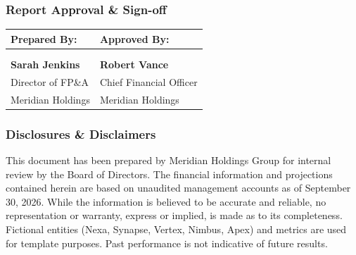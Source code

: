 \noindent
\begin{minipage}[t]{0.48\textwidth}
  \subsubsection*{Report Approval \& Sign-off}
  \vspace{5pt}
  \begin{tabularx}{\linewidth}{X X}
    \toprule
    \textbf{Prepared By:} & \textbf{Approved By:} \\
    \midrule
    & \\
    & \\
    \textbf{Sarah Jenkins} & \textbf{Robert Vance} \\
    Director of FP\&A & Chief Financial Officer \\
    Meridian Holdings & Meridian Holdings \\
    \bottomrule
  \end{tabularx}
\end{minipage}\hfill
\begin{minipage}[t]{0.48\textwidth}
  \subsubsection*{Disclosures \& Disclaimers}
  \fontsize{7.5pt}{9pt}\selectfont\color{DarkText}
  This document has been prepared by Meridian Holdings Group for internal review by the Board of Directors. The financial information and projections contained herein are based on unaudited management accounts as of September 30, 2026. While the information is believed to be accurate and reliable, no representation or warranty, express or implied, is made as to its completeness. Fictional entities (Nexa, Synapse, Vertex, Nimbus, Apex) and metrics are used for template purposes. Past performance is not indicative of future results.
\end{minipage}
\par
